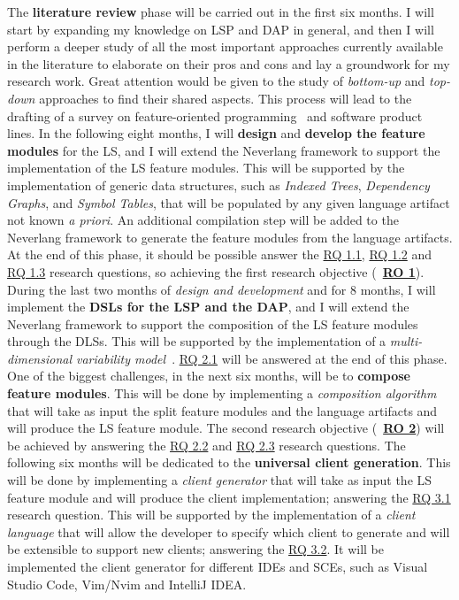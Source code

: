 The \textbf{literature review} phase will be carried out in the first six months. I will start by expanding my knowledge on LSP and DAP in general, and then I will perform a deeper study of all the most important approaches currently available in the literature to elaborate on their pros and cons and lay a groundwork for my research work. Great attention would be given to the study of \textit{bottom-up} and \textit{top-down} approaches to find their shared aspects. This process will lead to the drafting of a survey on feature-oriented programming~\cite{Prehofer97} and software product lines.
In the following eight months, I will \textbf{design} and \textbf{develop the feature modules} for the LS, and I will extend the Neverlang framework to support the implementation of the LS feature modules. This will be supported by the implementation of generic data structures, such as \textit{Indexed Trees}, \textit{Dependency Graphs}, and \textit{Symbol Tables}, that will be populated by any given language artifact not known \textit{a priori}. An additional compilation step will be added to the Neverlang framework to generate the feature modules from the language artifacts. At the end of this phase, it should be possible answer the \hyperlink{rq11}{\textsf{RQ 1.1}}, \hyperlink{rq12}{\textsf{RQ 1.2}} and \hyperlink{rq13}{\textsf{RQ 1.3}} research questions, so achieving the first research objective (~\hyperlink{ro1}{\textbf{RO 1}}).
During the last two months of \textit{design and development} and for 8 months, I will implement the \textbf{DSLs for the LSP and the DAP}, and I will extend the Neverlang framework to support the composition of the LS feature modules through the DLSs. This will be supported by the implementation of a \textit{multi-dimensional variability model}~\cite{Rosenmuller11}. \hyperlink{rq21}{\textsf{RQ 2.1}} will be answered at the end of this phase.
One of the biggest challenges, in the next six months, will be to \textbf{compose feature modules}. This will be done by implementing a \textit{composition algorithm} that will take as input the split feature modules and the language artifacts and will produce the LS feature module. The second research objective (~\hyperlink{ro2}{\textbf{RO 2}}) will be achieved by answering the \hyperlink{rq22}{\textsf{RQ 2.2}} and \hyperlink{rq23}{\textsf{RQ 2.3}} research questions.
The following six months will be dedicated to the \textbf{universal client generation}. This will be done by implementing a \textit{client generator} that will take as input the LS feature module and will produce the client implementation; answering the \hyperlink{rq31}{\textsf{RQ 3.1}} research question. This will be supported by the implementation of a \textit{client language} that will allow the developer to specify which client to generate and will be extensible to support new clients; answering the \hyperlink{rq31}{\textsf{RQ 3.2}}. It will be implemented the client generator for different IDEs and SCEs, such as Visual Studio Code, Vim/Nvim and IntelliJ IDEA.
